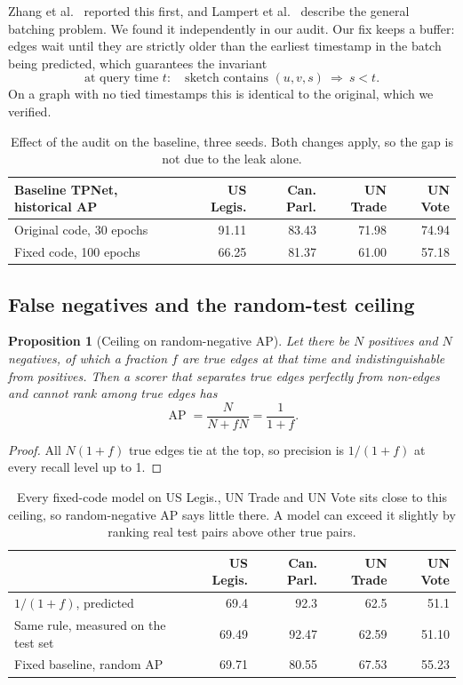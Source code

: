 \documentclass[11pt,a4paper]{article}
\newtheorem{proposition}{Proposition}
\theoremstyle{remark}
\DeclareMathOperator{\AP}{AP}
\begin{document}
Zhang et al.\ \cite{snam} reported this first, and Lampert et al.\ \cite{lampert} describe the general batching problem. We found it independently in our audit. Our fix keeps a buffer: edges wait until they are strictly older than the earliest timestamp in the batch being predicted, which guarantees the invariant
\begin{equation}
\text{at query time } t:\quad \text{sketch contains } (u,v,s)\ \Longrightarrow\ s<t .
\end{equation}
On a graph with no tied timestamps this is identical to the original, which we verified.

\begin{table}[h]\centering\small
\begin{tabular}{lrrrr}
\toprule
Baseline TPNet, historical AP & US Legis. & Can. Parl. & UN Trade & UN Vote\\
\midrule
Original code, 30 epochs & 91.11 & 83.43 & 71.98 & 74.94\\
Fixed code, 100 epochs & 66.25 & 81.37 & 61.00 & 57.18\\
\bottomrule
\end{tabular}
\caption{Effect of the audit on the baseline, three seeds. Both changes apply, so the gap is not due to the leak alone.}\label{tab:leak}
\end{table}

\subsection{False negatives and the random-test ceiling}
\begin{proposition}[Ceiling on random-negative AP]\label{prop:ceiling}
Let there be $N$ positives and $N$ negatives, of which a fraction $f$ are true edges at that time and indistinguishable from positives. Then a scorer that separates true edges perfectly from non-edges and cannot rank among true edges has
\begin{equation}
\AP=\frac{N}{N+fN}=\frac{1}{1+f}.
\end{equation}
\end{proposition}
\begin{proof}
All $N(1+f)$ true edges tie at the top, so precision is $1/(1+f)$ at every recall level up to 1.
\end{proof}
\begin{table}[h]\centering\small
\begin{tabular}{lrrrr}
\toprule
 & US Legis. & Can. Parl. & UN Trade & UN Vote\\
\midrule
$1/(1+f)$, predicted & 69.4 & 92.3 & 62.5 & 51.1\\
Same rule, measured on the test set & 69.49 & 92.47 & 62.59 & 51.10\\
Fixed baseline, random AP & 69.71 & 80.55 & 67.53 & 55.23\\
\bottomrule
\end{tabular}
\caption{Every fixed-code model on US Legis., UN Trade and UN Vote sits close to this ceiling, so random-negative AP says little there. A model can exceed it slightly by ranking real test pairs above other true pairs.}\label{tab:ceiling}
\end{table}
\end{document}
